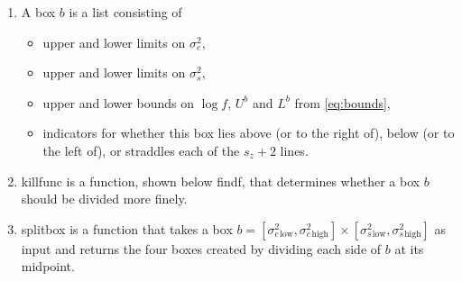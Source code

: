 \documentclass{report}
\newcommand{\textcompute}{\textsf}
\newcommand{\RL}{f}
\newcommand{\logRL}{\log\RL}
\newcommand{\sigssq}{\sigma_s^2}
\newcommand{\sigesq}{\sigma_e^2}
\newcommand{\sshat}{\hat\sigma^2_e,\hat\sigma^2_s}
\newcommand{\maxit}{\textcompute{maxit}}
\begin{document}
\begin{enumerate}
\item A \textcompute{box} $b$ is a list consisting of
	 \begin{itemize}
	 \item upper and lower limits on $\sigesq$,
	 \item upper and lower limits on $\sigssq$,
	 \item upper and lower bounds on $\logRL$, $U^b$ and $L^b$ from \eqref{eq:bounds},
	 \item indicators for whether this box lies above (or to the right of), below (or to the left of),
	   or straddles each of the $s_z+2$ lines.
	 \end{itemize}
\item \textcompute{killfunc} is a function, shown below \textcompute{findf}, that determines whether
	a box $b$ should be divided more finely.
\item \textcompute{splitbox} is a function that takes a box $b =
	[\sigesq{}_\text{low}, \sigesq{}_\text{high}] \times [\sigssq{}_\text{low}, \sigssq{}_\text{high}]$ as input 
	and returns the four boxes created by dividing each side of $b$ at its midpoint.
\end{enumerate}
\end{document}
